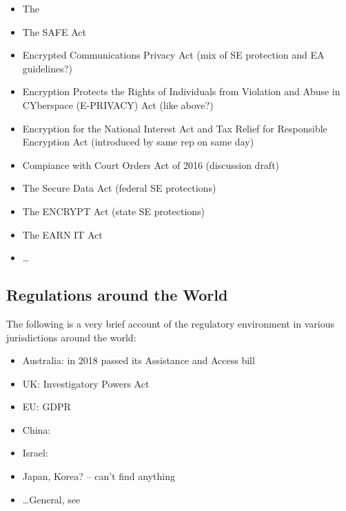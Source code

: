 \begin{itemize}
    \item The  \cite{press_1993} \cite{thompson_2015}
    \item The SAFE Act \cite{goodlatte_hr3011_1996}
    \item Encrypted Communications Privacy Act (mix of SE protection and EA guidelines?) \cite{leahy_s376_1997}
    \item Encryption Protects the Rights of Individuals from Violation and Abuse in CYberspace (E-PRIVACY) Act
        (like above?) \cite{ashcroft_s2067_1998}
    \item Encryption for the National Interest Act and Tax Relief for Responsible Encryption Act (introduced by same rep
        on same day) \cite{goss_hr2616_1999} \cite{goss_hr2617_1999}
    \item Compiance with Court Orders Act of 2016 (discussion draft) \cite{burr_2016}
    \item The Secure Data Act (federal SE protections) \cite{lofgren_hr5823_2018}
    \item The ENCRYPT Act (state SE protections) \cite{lieu_hr4170_2019}
    \item The EARN IT Act \cite{graham_s3398_2020}
    \item \dots
\end{itemize}

\subsection{Regulations around the World}

The following is a very brief account of the regulatory environment in various jurisdictions around the world:

\begin{itemize}
    \item Australia: in 2018 passed its Assistance and Access bill \cite{ag_2018} \cite{newman_2018}
    \item UK: Investigatory Powers Act \cite{legislature_2016}
    \item EU: GDPR \cite{parliament_2016}
    \item China: \cite{donahue_comparative_2018}
    \item Israel: \cite{donahue_comparative_2018}
    \item Japan, Korea? -- can't find anything
    \item \dots General, see \cite{budish_encryption_2018}
\end{itemize}


